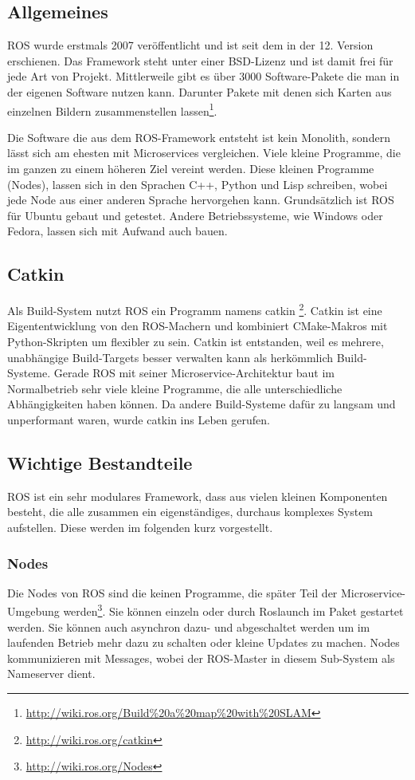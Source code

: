 \subsection{Allgemeines}

ROS wurde erstmals 2007 veröffentlicht und ist seit dem in der 12. Version erschienen. Das Framework steht unter einer BSD-Lizenz und ist damit frei für jede Art von Projekt. Mittlerweile gibt es über 3000 Software-Pakete die man in der eigenen Software nutzen kann. Darunter Pakete mit denen sich Karten aus einzelnen Bildern zusammenstellen lassen\footnote{\url{http://wiki.ros.org/Build\%20a\%20map\%20with\%20SLAM}}.

Die Software die aus dem ROS-Framework entsteht ist kein Monolith, sondern lässt sich am ehesten mit Microservices vergleichen. Viele kleine Programme, die im ganzen zu einem höheren Ziel vereint werden. Diese kleinen Programme (Nodes), lassen sich in den Sprachen C++, Python und Lisp schreiben, wobei jede Node aus einer anderen Sprache hervorgehen kann. Grundsätzlich ist ROS für Ubuntu gebaut und getestet. Andere Betriebssysteme, wie Windows oder Fedora, lassen sich mit Aufwand auch bauen.

\subsection*{Catkin}

Als Build-System nutzt ROS ein Programm namens catkin \footnote{\url{http://wiki.ros.org/catkin}}. Catkin ist eine Eigententwicklung von den ROS-Machern und kombiniert CMake-Makros mit Python-Skripten um flexibler zu sein. Catkin ist entstanden, weil es mehrere, unabhängige Build-Targets besser verwalten kann als herkömmlich Build-Systeme. Gerade ROS mit seiner Microservice-Architektur baut im Normalbetrieb sehr viele kleine Programme, die alle unterschiedliche Abhängigkeiten haben können. Da andere Build-Systeme dafür zu langsam und unperformant waren, wurde catkin ins Leben gerufen.

\subsection*{Wichtige Bestandteile}

ROS ist ein sehr modulares Framework, dass aus vielen kleinen Komponenten besteht, die alle zusammen ein eigenständiges, durchaus komplexes System aufstellen. Diese werden im folgenden kurz vorgestellt.

\subsubsection*{Nodes}
Die Nodes von ROS sind die keinen Programme, die später Teil der Microservice-Umgebung werden\footnote{\url{http://wiki.ros.org/Nodes}}. Sie können einzeln oder durch Roslaunch im Paket gestartet werden. Sie können auch asynchron dazu- und abgeschaltet werden um im laufenden Betrieb mehr dazu zu schalten oder kleine Updates zu machen. Nodes kommunizieren mit Messages, wobei der ROS-Master in diesem Sub-System als Nameserver dient.

